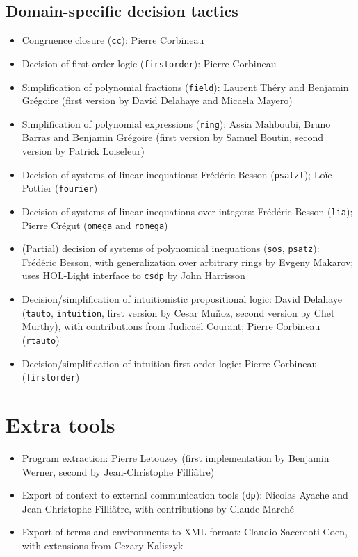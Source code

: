 \documentclass{article}
\begin{document}
\subsection{Domain-specific decision tactics}

\begin{itemize}
\item Congruence closure (\texttt{cc}): Pierre Corbineau
\item Decision of first-order logic (\texttt{firstorder}): Pierre Corbineau
\item Simplification of polynomial fractions (\texttt{field}): Laurent
  Théry and Benjamin Grégoire (first version by David Delahaye and
  Micaela Mayero)
\item Simplification of polynomial expressions (\texttt{ring}): Assia
  Mahboubi, Bruno Barras and Benjamin Grégoire (first version by
  Samuel Boutin, second version by Patrick Loiseleur)
\item Decision of systems of linear inequations: Frédéric Besson
  (\texttt{psatzl}); Loïc Pottier (\texttt{fourier})
\item Decision of systems of linear inequations over integers:
  Frédéric Besson (\texttt{lia}); Pierre Crégut (\texttt{omega} and
  \texttt{romega})
\item (Partial) decision of systems of polynomical inequations
  (\texttt{sos}, \texttt{psatz}): Frédéric Besson, with generalization
  over arbitrary rings by Evgeny Makarov; uses HOL-Light interface to
  \texttt{csdp} by John Harrisson
\item Decision/simplification of intuitionistic propositional logic:
  David Delahaye (\texttt{tauto}, \texttt{intuition}, first version by
  Cesar Mu\~noz, second version by Chet Murthy), with contributions
  from Judicaël Courant; Pierre Corbineau (\texttt{rtauto})
\item Decision/simplification of intuition first-order logic: Pierre
  Corbineau (\texttt{firstorder})
\end{itemize}

\section{Extra tools}

\begin{itemize}
\item Program extraction: Pierre Letouzey (first implementation by
  Benjamin Werner, second by Jean-Christophe Filliâtre)
\item Export of context to external communication tools (\texttt{dp}):
  Nicolas Ayache and Jean-Christophe Filliâtre, with contributions by
  Claude Marché
\item Export of terms and environments to XML format: Claudio
  Sacerdoti Coen, with extensions from Cezary Kaliszyk
\end{itemize}
\end{document}
